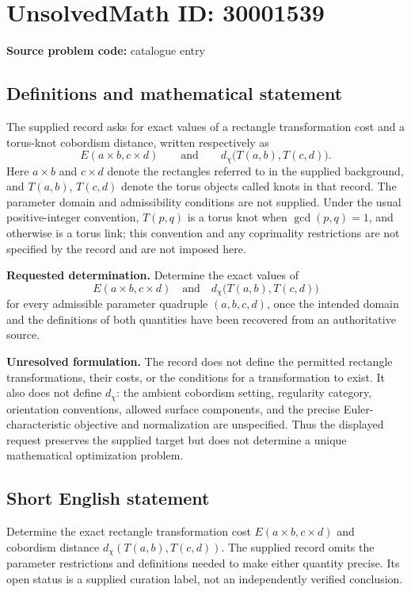 \documentclass[11pt]{article}
\begin{document}
\section*{UnsolvedMath ID: 30001539}
\textbf{Source problem code:} catalogue entry
\subsection{Definitions and mathematical statement}
The supplied record asks for exact values of a rectangle transformation cost and a torus-knot cobordism distance, written respectively as
\[
E(a\times b,c\times d)
\qquad\text{and}\qquad
d_{\chi}\bigl(T(a,b),T(c,d)\bigr).
\]
Here \(a\times b\) and \(c\times d\) denote the rectangles referred to in the supplied background, and \(T(a,b)\), \(T(c,d)\) denote the torus objects called knots in that record. The parameter domain and admissibility conditions are not supplied. Under the usual positive-integer convention, \(T(p,q)\) is a torus knot when \(\gcd(p,q)=1\), and otherwise is a torus link; this convention and any coprimality restrictions are not specified by the record and are not imposed here.

\textbf{Requested determination.} Determine the exact values of
\[
E(a\times b,c\times d)
\quad\text{and}\quad
d_{\chi}\bigl(T(a,b),T(c,d)\bigr)
\]
for every admissible parameter quadruple \((a,b,c,d)\), once the intended domain and the definitions of both quantities have been recovered from an authoritative source.

\textbf{Unresolved formulation.} The record does not define the permitted rectangle transformations, their costs, or the conditions for a transformation to exist. It also does not define \(d_{\chi}\): the ambient cobordism setting, regularity category, orientation conventions, allowed surface components, and the precise Euler-characteristic objective and normalization are unspecified. Thus the displayed request preserves the supplied target but does not determine a unique mathematical optimization problem.
\subsection{Short English statement}
Determine the exact rectangle transformation cost \(E(a\times b,c\times d)\) and cobordism distance \(d_{\chi}(T(a,b),T(c,d))\). The supplied record omits the parameter restrictions and definitions needed to make either quantity precise. Its open status is a supplied curation label, not an independently verified conclusion.
\end{document}
